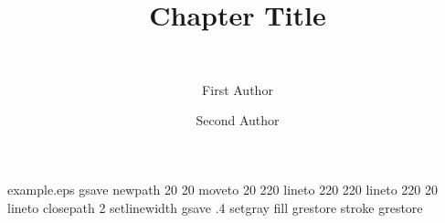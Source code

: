 %
%
%

\begin{filecontents*}{example.eps}
gsave
newpath
  20 20 moveto
  20 220 lineto
  220 220 lineto
  220 20 lineto
closepath
2 setlinewidth
gsave
  .4 setgray fill
grestore
stroke
grestore
\end{filecontents*}
%
\RequirePackage{fix-cm}
%
\documentclass[smallextended]{svjour3}       %
%
\smartqed  %
%
\usepackage{graphicx}
%
%
%
%
%


\title{Chapter Title %
}
\subtitle{\\ }


\author{First Author         \and
        Second Author %
}



